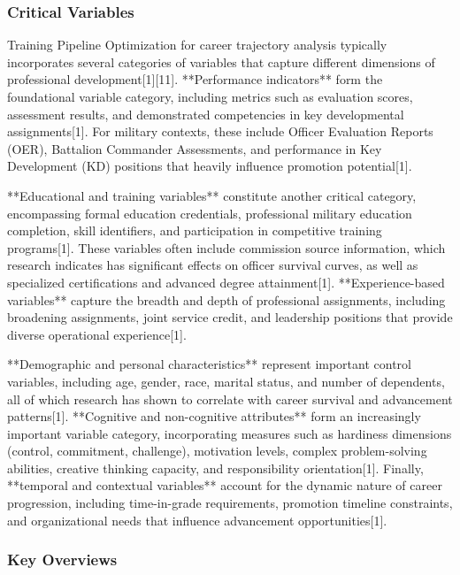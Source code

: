 \documentclass[main.tex]{subfiles}
\begin{document}
\subsubsection{Critical Variables}

Training Pipeline Optimization for career trajectory analysis typically incorporates several categories of variables that capture different dimensions of professional development[1][11]. **Performance indicators** form the foundational variable category, including metrics such as evaluation scores, assessment results, and demonstrated competencies in key developmental assignments[1]. For military contexts, these include Officer Evaluation Reports (OER), Battalion Commander Assessments, and performance in Key Development (KD) positions that heavily influence promotion potential[1].

**Educational and training variables** constitute another critical category, encompassing formal education credentials, professional military education completion, skill identifiers, and participation in competitive training programs[1]. These variables often include commission source information, which research indicates has significant effects on officer survival curves, as well as specialized certifications and advanced degree attainment[1]. **Experience-based variables** capture the breadth and depth of professional assignments, including broadening assignments, joint service credit, and leadership positions that provide diverse operational experience[1].

**Demographic and personal characteristics** represent important control variables, including age, gender, race, marital status, and number of dependents, all of which research has shown to correlate with career survival and advancement patterns[1]. **Cognitive and non-cognitive attributes** form an increasingly important variable category, incorporating measures such as hardiness dimensions (control, commitment, challenge), motivation levels, complex problem-solving abilities, creative thinking capacity, and responsibility orientation[1]. Finally, **temporal and contextual variables** account for the dynamic nature of career progression, including time-in-grade requirements, promotion timeline constraints, and organizational needs that influence advancement opportunities[1].

\subsubsection{Key Overviews}
\end{document}
